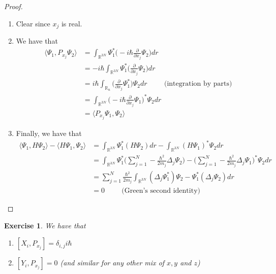 \documentclass[12pt]{amsart}
\newtheorem{ex}[thm]{Exercise}
\renewcommand{\r}{\rangle}
\renewcommand{\l}{\langle}
\newcommand{\del}{\delta}
\newcommand{\Del}{\Delta}
\newcommand{\R}{\mathbb{R}}
\newcommand{\p}[1]{\frac{\partial}{\partial{#1}}}
\begin{document}
\begin{proof}\
	\begin{enumerate}
		\item Clear since $x_j$ is real.
		\item We have that 
		\begin{align*}
			\l \Psi_1 , P_{x_j} \Psi_2 \r
			&=  \int_{\R^{3N}} \Psi_1^* \bigg(-i\hbar\p{x_j} \Psi_2\bigg)dr \\
			&= -i \hbar\int_{\R^{3N}} \Psi_1^*  \bigg(\p{x_j} \Psi_2\bigg)dr\\
			&= i\hbar \int_{\R_n} \bigg( \p{x_j} \Psi_1^* \bigg) \Psi_2 dr \hspace{1cm } \text{(integration by parts)}\\
			&= \int_{\R^{3N}} \bigg( -i \hbar \p{x_j} \Psi_1 \bigg)^* \Psi_2 dr\\
			&= \l P_{x_j} \Psi_1 , \Psi_2 \r
		\end{align*}
		\item Finally, we have that
		\begin{align*}
			\l \Psi_1 , H \Psi_2 \r - \l H \Psi_1 ,  \Psi_2 \r
			&= \int_{\R^{3N}} \Psi_1^* (H \Psi_2) dr - \int_{\R^{3N}} ( H \Psi_1 )^*  \Psi_2 dr \\
			&= \int_{\R^{3N}} \Psi_1^* \bigg( \sum_{j=1}^N  -\frac{\hbar^2}{2m_j}\Del_j \Psi_2 \bigg) -  \bigg(\sum_{j=1}^N  -\frac{\hbar^2}{2m_j}\Del_j \Psi_1 \bigg)^*  \Psi_2 dr \\
			&= \sum_{j=1}^N \frac{\hbar^2}{2m_j}\int_{\R^{3N}} (\Del_j \Psi_1^* )\Psi_2 - \Psi_1^*(\Del_j \Psi_2)dr\\
			&= 0 \hspace{1cm} \text{(Green's second identity)}
		\end{align*}
	\end{enumerate}
\end{proof}

\begin{ex}
	We have that 
	\begin{enumerate}
		\item $[X_i, P_{x_j}] = \del_{i,j}i\hbar$
		\item $[Y_i, P_{x_j}] = 0$ (and similar for any other mix of $x,y$ and $z$)
	\end{enumerate}
\end{ex}
\end{document}
